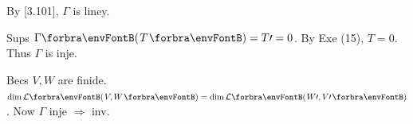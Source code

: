 {By [3.101], $\Gamma$ is liney.\par\quad
Sups $\Gamma\Par{T}=T\apostrophe=0$. By Exe (15), $T=0$. Thus $\Gamma$ is inje.\par\quad
Becs $V,W$ are finide. $\dim\Lm{V,W}=\dim\Lm{W\apostrophe,V\apostrophe}$. Now $\Gamma$ inje $\Rightarrow$ inv.\PfEnd\vspace{4pt}
}
